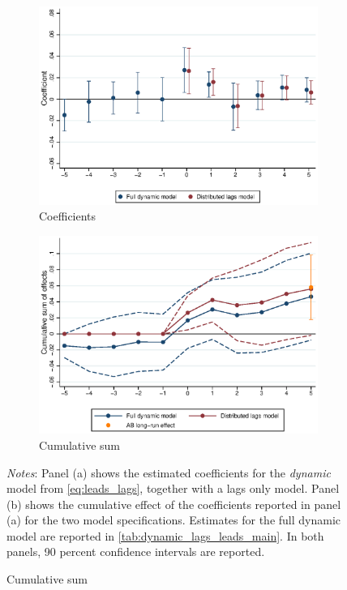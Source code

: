 \begin{figure}[htb!]
    \caption{The dynamic effects of MW increases on rents}
    \label{fig:fd_models_main}
    \centering
    \begin{subfigure}[b]{0.8\textwidth}
    	\caption{Coefficients}
    	\label{fig:dynamic_model_coeffs}
    	\includegraphics[width = \textwidth]
    	{../../analysis/first_differences/output/fd_models_coeffs_w5.eps}
    \end{subfigure}
    \begin{subfigure}[b]{0.8\textwidth}
    	\caption{Cumulative sum}
    	\label{fig:dynamic_model_cumsum}
    	\includegraphics[width = \textwidth]
    	{../../analysis/first_differences/output/fd_models_cumsum.eps}
    \end{subfigure}
    \begin{minipage}{0.95\textwidth} \footnotesize
		\vspace{2mm} 
		\textit{Notes}: Panel (a) shows the estimated coefficients for the \textit{dynamic} model from 
		 \autoref{eq:leads_lags}, together with a lags only model. Panel (b) shows the cumulative 
		 effect of the coefficients reported in panel (a) for the two model specifications. Estimates
		 for the full dynamic model are reported in \autoref{tab:dynamic_lags_leads_main}. In both panels, 
		 90 percent confidence intervals are reported. 
	\end{minipage}
\end{figure}

